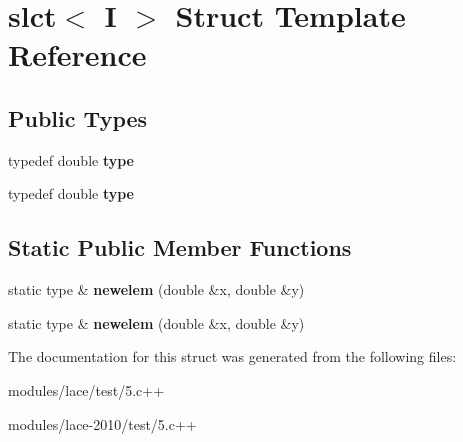 \hypertarget{structslct}{\section{slct$<$ I $>$ Struct Template Reference}
\label{structslct}
}
\subsection*{Public Types}
\begin{DoxyCompactItemize}
\item 
\hypertarget{structslct_a9281fdc7c38080ddc9173dd0d6a48c87}{typedef double {\bfseries type}}\label{structslct_a9281fdc7c38080ddc9173dd0d6a48c87}

\item 
\hypertarget{structslct_a9281fdc7c38080ddc9173dd0d6a48c87}{typedef double {\bfseries type}}\label{structslct_a9281fdc7c38080ddc9173dd0d6a48c87}

\end{DoxyCompactItemize}
\subsection*{Static Public Member Functions}
\begin{DoxyCompactItemize}
\item 
\hypertarget{structslct_a9d638284abd8fe3c1a93dd25cfe79dc8}{static type \& {\bfseries newelem} (double \&x, double \&y)}\label{structslct_a9d638284abd8fe3c1a93dd25cfe79dc8}

\item 
\hypertarget{structslct_a9d638284abd8fe3c1a93dd25cfe79dc8}{static type \& {\bfseries newelem} (double \&x, double \&y)}\label{structslct_a9d638284abd8fe3c1a93dd25cfe79dc8}

\end{DoxyCompactItemize}


The documentation for this struct was generated from the following files\-:\begin{DoxyCompactItemize}
\item 
modules/lace/test/5.\-c++\item 
modules/lace-\/2010/test/5.\-c++\end{DoxyCompactItemize}
